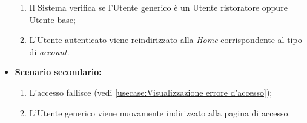\begin{itemize}
\begin{enumerate}
		      \item Il Sistema verifica se l'Utente generico è un Utente ristoratore oppure Utente base;
		      \item L'Utente autenticato viene reindirizzato alla \textit{Home} corrispondente al tipo di \textit{account}.
	      \end{enumerate}
		
	\item \textbf{Scenario secondario:}
		\begin{enumerate}
			\item L'accesso fallisce (vedi \autoref{usecase:Visualizzazione errore d'accesso});
			\item L'Utente generico viene nuovamente indirizzato alla pagina di accesso.
		\end{enumerate}	
	\end{itemize}
